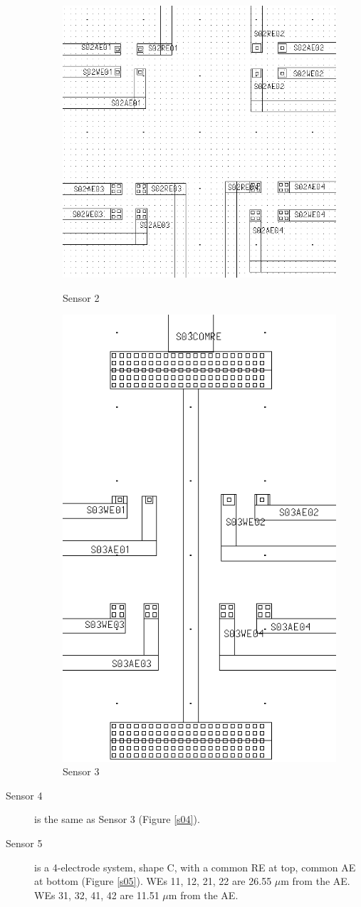 \begin{description}
\begin{figure}
	\begin{minipage}{0.5\linewidth}
		\centering
		\includegraphics[width=0.6\linewidth]{figures/s02.png}
		\caption{Sensor 2}
		\label{s02}
	\end{minipage}
	\begin{minipage}{0.5\linewidth}
		\centering
		\includegraphics[width=0.6\linewidth]{figures/s03.png}
		\caption{Sensor 3}
		\label{s03}
	\end{minipage}
\end{figure}

\item[Sensor 4] is the same as Sensor 3 (Figure \ref{s04}).
\item[Sensor 5] is a 4-electrode system, shape C, with a common RE at top, common AE at bottom (Figure \ref{s05}). WEs 11, 12, 21, 22 are 26.55 $\mu \mathrm{m}$ from the AE. WEs 31, 32, 41, 42 are 11.51 $\mu \mathrm{m}$ from the AE.


\end{description}
